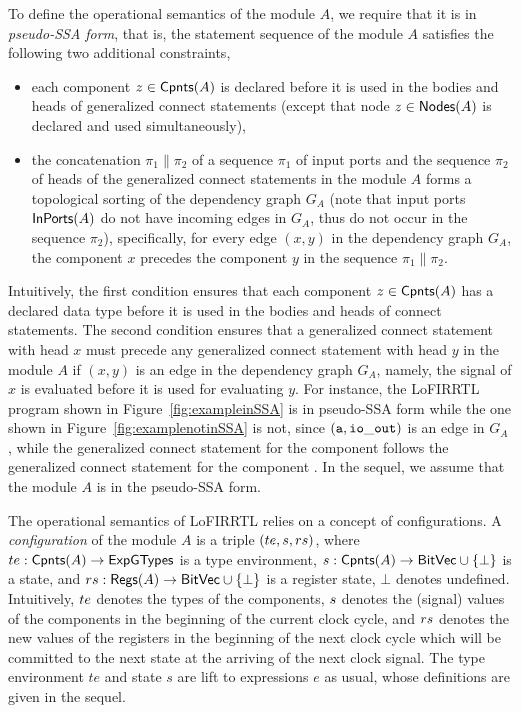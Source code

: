 To define the operational semantics of the module $A$, we require that it is in \emph{pseudo-SSA form}, that is,  the statement sequence of the module $A$ satisfies the following two additional constraints,
\begin{itemize}
\item each component $z\in {\sf Cpnts}(A)$ is declared before it is used in the bodies and heads of generalized connect statements (except that node $z\in {\sf Nodes}(A)$ is declared and used simultaneously),
%
\item the concatenation $\pi_1\|\pi_2$ of a sequence  $\pi_1$ of input ports and the sequence $\pi_2$ of heads of the generalized connect statements in the module $A$ forms
 a topological sorting of  the dependency graph $G_A$ (note that input ports ${\sf InPorts}(A)$ do not have incoming edges in $G_A$, thus
do not occur in the sequence $\pi_2$),
specifically, for every edge $(x, y)$ in the dependency graph $G_A$,
the component $x$ precedes the component $y$ in the sequence $\pi_1\|\pi_2$. %
\end{itemize}

Intuitively,
the first condition ensures that each component $z\in {\sf Cpnts}(A)$ has a declared data type
before it is used in the bodies and heads of connect statements.
The second condition ensures that a generalized connect statement with head $x$
must precede any generalized connect statement with head $y$ in the module $A$ if $(x, y)$ is an edge in the dependency graph $G_A$,
namely, the signal of $x$ is evaluated before it is used for evaluating $y$.
For instance, the LoFIRRTL program shown in Figure~\ref{fig:exampleinSSA} is in
pseudo-SSA form while the one shown in Figure~\ref{fig:examplenotinSSA} is not, since
$({\tt a}, {\tt io\_out})$ is an edge in $G_A$, while
the generalized connect statement   for the component  follows
the generalized connect statement  for the component .
In the sequel, we assume that the module $A$ is in the pseudo-SSA form.




The operational semantics of LoFIRRTL relies on a concept of configurations.
A \emph{configuration} of the module $A$ is a triple $({te}, {s}, {rs})$, where ${te}:{\sf Cpnts}(A)\rightarrow {\sf ExpGTypes}$ is a type environment,
${s}: {\sf Cpnts}(A)\rightarrow {\sf BitVec} \cup \{\bot\}$ is a state, and ${rs}: {\sf Regs}(A)\rightarrow {\sf BitVec} \cup \{\bot\}$ is a register state,
$\bot$ denotes undefined.
Intuitively, ${te}$ denotes the types of the components, ${s}$ denotes the (signal) values of the components in the beginning of the current clock cycle, and ${rs}$ denotes the new values of the registers in the beginning of the next clock cycle which will be committed to the next state at the arriving of the next clock signal.
The type environment $te$ and state $s$ are lift to expressions $e$ as usual, whose definitions are given in the sequel. %

